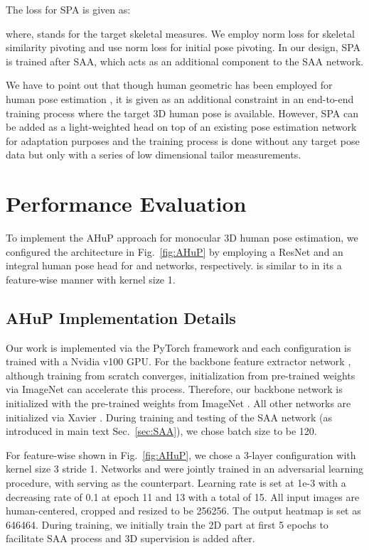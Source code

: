 \documentclass[twocolumn]{svjour3}          \smartqed  \usepackage{graphicx}
\newcommand{\figref}[1]{Fig.~\ref{#1}}
\newcommand{\secref}[1]{Sec.~\ref{#1}}
\begin{document}
The loss for SPA is given as: 

where,  stands for the target skeletal measures. We employ norm  loss for skeletal similarity pivoting and use norm  loss for initial pose pivoting. In our design, SPA is trained after SAA, which acts as an additional component to the SAA network.  

We have to point out that though human geometric has been employed for human pose estimation \cite{zhou2017towards}, it is given as an additional constraint in an end-to-end training process where the target 3D human pose is available. 
However, SPA can be added as a light-weighted head on top of an existing pose estimation network for adaptation purposes and the training process is done without any target pose data but only with a series of low dimensional tailor measurements.  




\section{Performance Evaluation} 
To implement the AHuP approach for monocular  3D human pose estimation, we configured the architecture in \figref{fig:AHuP} by employing a ResNet \cite{he2016deep} and an integral human pose head \cite{sun2018integral} for  and  networks, respectively.  is similar to \cite{isola2017image} in its a feature-wise manner with kernel size 1. 
\subsection{AHuP Implementation Details}
Our work is implemented via the PyTorch framework and each configuration is trained with a Nvidia v100 GPU. For the backbone feature extractor network , although training from scratch converges, initialization from pre-trained weights via ImageNet can accelerate this process. Therefore, our backbone network is initialized with the pre-trained weights from ImageNet \cite{deng2009imagenet}. 
All other networks are initialized via Xavier \cite{glorot2010understanding}. 
During training and testing of the SAA network (as introduced in main text \secref{sec:SAA}), we chose batch size to be 120. 

For feature-wise  shown in \figref{fig:AHuP}, we chose a 3-layer configuration with kernel size 3 stride 1. Networks  and  were jointly trained in an adversarial learning procedure, with  serving as the counterpart. Learning rate is set at 1e-3 with a decreasing rate of 0.1 at epoch 11 and 13 with a total of 15. All input images are human-centered, cropped and resized to be 256256. The output heatmap is set as 646464. 
During training, we initially train the 2D part at first 5 epochs to facilitate SAA process and 3D supervision is added after. 
\end{document}
